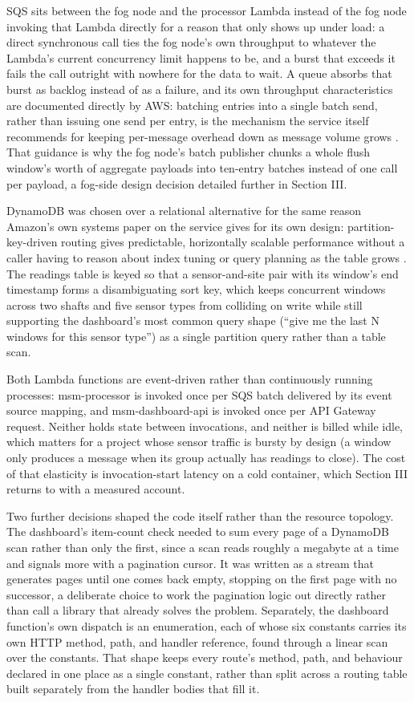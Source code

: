 \documentclass[conference]{IEEEtran}
\begin{document}
SQS sits between the fog node and the processor Lambda instead of the fog node invoking that Lambda directly for a reason that only shows up under load: a direct synchronous call ties the fog node's own throughput to whatever the Lambda's current concurrency limit happens to be, and a burst that exceeds it fails the call outright with nowhere for the data to wait. A queue absorbs that burst as backlog instead of as a failure, and its own throughput characteristics are documented directly by AWS: batching entries into a single batch send, rather than issuing one send per entry, is the mechanism the service itself recommends for keeping per-message overhead down as message volume grows \cite{ref6}. That guidance is why the fog node's batch publisher chunks a whole flush window's worth of aggregate payloads into ten-entry batches instead of one call per payload, a fog-side design decision detailed further in Section III.

DynamoDB was chosen over a relational alternative for the same reason Amazon's own systems paper on the service gives for its own design: partition-key-driven routing gives predictable, horizontally scalable performance without a caller having to reason about index tuning or query planning as the table grows \cite{ref7}. The readings table is keyed so that a sensor-and-site pair with its window's end timestamp forms a disambiguating sort key, which keeps concurrent windows across two shafts and five sensor types from colliding on write while still supporting the dashboard's most common query shape (``give me the last N windows for this sensor type'') as a single partition query rather than a table scan.

Both Lambda functions are event-driven rather than continuously running processes: msm-processor is invoked once per SQS batch delivered by its event source mapping, and msm-dashboard-api is invoked once per API Gateway request. Neither holds state between invocations, and neither is billed while idle, which matters for a project whose sensor traffic is bursty by design (a window only produces a message when its group actually has readings to close). The cost of that elasticity is invocation-start latency on a cold container, which Section III returns to with a measured account.

Two further decisions shaped the code itself rather than the resource topology. The dashboard's item-count check needed to sum every page of a DynamoDB scan rather than only the first, since a scan reads roughly a megabyte at a time and signals more with a pagination cursor. It was written as a stream that generates pages until one comes back empty, stopping on the first page with no successor, a deliberate choice to work the pagination logic out directly rather than call a library that already solves the problem. Separately, the dashboard function's own dispatch is an enumeration, each of whose six constants carries its own HTTP method, path, and handler reference, found through a linear scan over the constants. That shape keeps every route's method, path, and behaviour declared in one place as a single constant, rather than split across a routing table built separately from the handler bodies that fill it.
\end{document}
